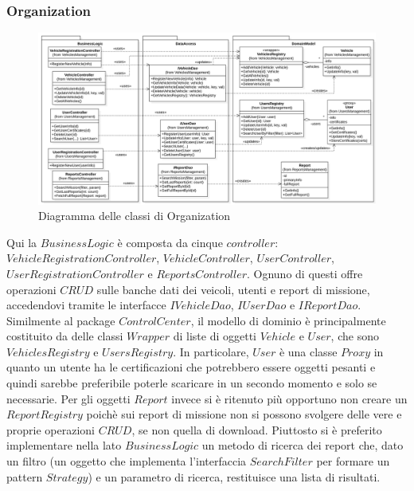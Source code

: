 \documentclass{article}
\begin{document}
    \subsubsection{Organization}
    \begin{figure}
        \centering
        \includegraphics[width=6in]{diagrams/png/uml-organization.png}
        \caption{Diagramma delle classi di Organization}
        \label{fig:uml-organization}
    \end{figure}
    Qui la $BusinessLogic$ è composta da cinque $controller$: $VehicleRegistrationController$, $VehicleController$, $UserController$, $UserRegistrationController$ e $ReportsController$.
    Ognuno di questi offre operazioni $CRUD$ sulle banche dati dei veicoli, utenti e report di missione, accedendovi tramite le interfacce $IVehicleDao$, $IUserDao$ e $IReportDao$.
    Similmente al package $ControlCenter$, il modello di dominio è principalmente costituito da delle classi $Wrapper$ di liste di oggetti $Vehicle$ e $User$, che sono $VehiclesRegistry$ e $UsersRegistry$.
    In particolare, $User$ è una classe $Proxy$ in quanto un utente ha le certificazioni che potrebbero essere oggetti pesanti e quindi sarebbe preferibile poterle scaricare in un secondo momento e solo se necessarie.
    \newline Per gli oggetti $Report$ invece si è ritenuto più opportuno non creare un $ReportRegistry$ poichè sui report di missione non si possono svolgere delle vere e proprie operazioni $CRUD$, se non quella di download.
    Piuttosto si è preferito implementare nella lato $BusinessLogic$ un metodo di ricerca dei report che, dato un filtro (un oggetto che implementa l'interfaccia $SearchFilter$ per formare un pattern $Strategy$) e un parametro di ricerca, restituisce una lista di risultati.
\end{document}
